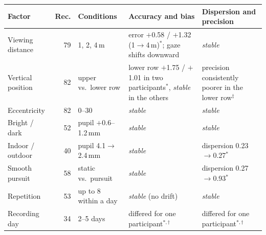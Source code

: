 \begin{tabular}{@{}p{}@{\hskip 4pt}r@{\hskip 8pt}p{}p{}p{}@{}}
\toprule
Factor & Rec. & Conditions & Accuracy and bias & Dispersion and precision \\
\midrule
Viewing distance & 79 & 1, 2, 4\,m & error $+$0.58\dg{} / $+$1.32\dg{} (1$\to$4\,m)$^*$; gaze shifts downward & \textit{stable} \\
Vertical position & 82 & upper vs.\ lower row & lower row $+$1.75\dg{} / $+$1.01\dg{} in two participants$^*$, \textit{stable} in the others & precision consistently poorer in the lower row$^{\ddagger}$ \\
Eccentricity & 82 & 0--30\dg{} & \textit{stable} & \textit{stable} \\
Bright / dark & 52 & pupil $+$0.6--1.2\,mm & \textit{stable} & \textit{stable} \\
Indoor / outdoor & 40 & pupil 4.1$\to$2.4\,mm & \textit{stable} & dispersion 0.23$\to$0.27\dg{}$^*$ \\
Smooth pursuit & 58 & static vs.\ pursuit & \textit{stable} & dispersion 0.27$\to$0.93\dg{}$^*$ \\
Repetition & 53 & up to 8 within a day & \textit{stable} (no drift) & \textit{stable} \\
Recording day & 34 & 2--5 days & differed for one participant$^{*,\dagger}$ & differed for one participant$^{*,\dagger}$ \\
\bottomrule
\end{tabular}
